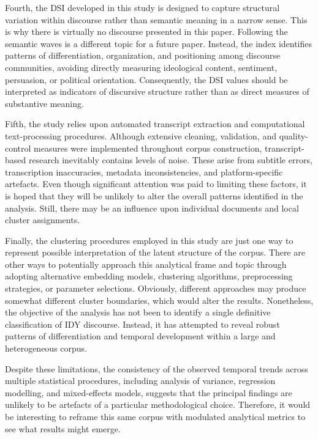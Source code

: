 \documentclass[11pt]{article}
\begin{document}
{Fourth, the DSI developed in this study is designed to capture structural variation within discourse rather than semantic meaning in a narrow sense. This is why there is virtually no discourse presented in this paper. Following the semantic waves is a different topic for a future paper. Instead, the index identifies patterns of differentiation, organization, and positioning among discourse communities, avoiding directly measuring ideological content, sentiment, persuasion, or political orientation. Consequently, the DSI values should be interpreted as indicators of discursive structure rather than as direct measures of substantive meaning.

Fifth, the study relies upon automated transcript extraction and computational text-processing procedures. Although extensive cleaning, validation, and quality-control measures were implemented throughout corpus construction, transcript-based research inevitably contains levels of noise. These arise from subtitle errors, transcription inaccuracies, metadata inconsistencies, and platform-specific artefacts. Even though significant attention was paid to limiting these factors, it is hoped that they will be unlikely to alter the overall patterns identified in the analysis. Still, there  may be an influence upon individual documents and local cluster assignments.

Finally, the clustering procedures employed in this study are just one way to represent possible interpretation of the latent structure of the corpus. There are other ways to potentially approach this analytical frame and topic through adopting alternative embedding models, clustering algorithms, preprocessing strategies, or parameter selections. Obviously, different approaches may produce somewhat different cluster boundaries, which would alter the results. Nonetheless, the objective of the analysis has not been to identify a single definitive classification of IDY discourse. Instead, it has attempted to reveal robust patterns of differentiation and temporal development within a large and heterogeneous corpus.

Despite these limitations, the consistency of the observed temporal trends across multiple statistical procedures, including analysis of variance, regression modelling, and mixed-effects models, suggests that the principal findings are unlikely to be artefacts of a particular methodological choice. Therefore, it would be interesting to reframe this same corpus with modulated analytical metrics to see what results might emerge.

}
\end{document}
